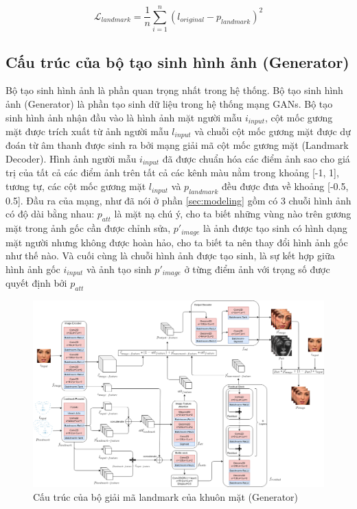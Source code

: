 \begin{equation}
    \mathcal{L}_{landmark} = \frac{1}{n}\sum^n_{i=1}(l_{original}-p_{landmark})^2
\end{equation}

\subsection{Cấu trúc của bộ tạo sinh hình ảnh (Generator)}\label{sec:generator_detail}

Bộ tạo sinh hình ảnh là phần quan trọng nhất trong hệ thống. Bộ tạo sinh hình ảnh (Generator) là phần tạo sinh dữ liệu trong hệ thống mạng GANs. Bộ tạo sinh hình ảnh nhận đầu vào là hình ảnh mặt người mẫu $i_{input}$, cột mốc gương mặt được trích xuất từ ảnh người mẫu $l_{input}$ và chuỗi cột mốc gương mặt được dự đoán từ âm thanh được sinh ra bởi mạng giải mã cột mốc gương mặt (Landmark Decoder). Hình ảnh người mẫu $i_{input}$ đã được chuẩn hóa các điểm ảnh sao cho giá trị của tất cả các điểm ảnh trên tất cả các kênh màu nằm trong khoảng [-1, 1], tương tự, các cột mốc gương mặt $l_{input}$ và $p_{landmark}$ đều được đưa về khoảng [-0.5, 0.5]. Đầu ra của mạng, như đã nói ở phần \ref{sec:modeling} gồm có 3 chuỗi hình ảnh có độ dài bằng nhau: $p_{att}$ là mặt nạ chú ý, cho ta biết những vùng nào trên gương mặt trong ảnh gốc cần được chỉnh sửa, $p'_{image}$ là ảnh được tạo sinh có hình dạng mặt người nhưng không được hoàn hảo, cho ta biết ta nên thay đổi hình ảnh gốc như thế nào. Và cuối cùng là chuỗi hình ảnh được tạo sinh, là sự kết hợp giữa hình ảnh gốc $i_{input}$ và ảnh tạo sinh $p'_{image}$ ở từng điểm ảnh với trọng số được quyết định bởi $p_{att}$ 

\begin{figure}[H]
    \centering
    \includegraphics[width=15cm]{./content/materials/generator.png}
    \caption{Cấu trúc của bộ giải mã landmark của khuôn mặt (Generator)}
\end{figure}

